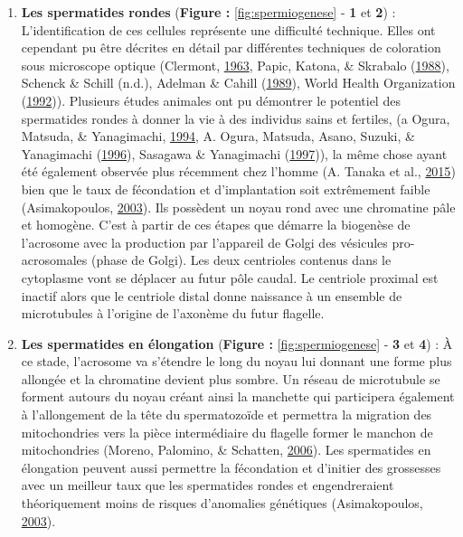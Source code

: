 \documentclass[12pt,twoside]{reedthesis}
\theoremstyle{definition}
\theoremstyle{definition}
\theoremstyle{remark}
\begin{document}
  \begin{enumerate}
  \def\labelenumi{\arabic{enumi}.}
  \item
    \textbf{Les spermatides rondes} (\textbf{Figure :
    }\ref{fig:spermiogenese} - \textbf{1} et \textbf{2}) :
    L'identification de ces cellules représente une difficulté technique.
    Elles ont cependant pu être décrites en détail par différentes
    techniques de coloration sous microscope optique (Clermont,
    \protect\hyperlink{ref-Clermont1963}{1963}, Papic, Katona, \& Skrabalo
    (\protect\hyperlink{ref-Papic}{1988}), Schenck \& Schill (n.d.),
    Adelman \& Cahill (\protect\hyperlink{ref-Adelman1989}{1989}), World
    Health Organization
    (\protect\hyperlink{ref-WorldHealthOrganization1992}{1992})).
    Plusieurs études animales ont pu démontrer le potentiel des
    spermatides rondes à donner la vie à des individus sains et fertiles,
    (a Ogura, Matsuda, \& Yanagimachi,
    \protect\hyperlink{ref-Ogura1994}{1994}, A. Ogura, Matsuda, Asano,
    Suzuki, \& Yanagimachi (\protect\hyperlink{ref-Kimura1995}{1996}),
    Sasagawa \& Yanagimachi (\protect\hyperlink{ref-Sasagawa}{1997})), la
    même chose ayant été également observée plus récemment chez l'homme
    (A. Tanaka et al., \protect\hyperlink{ref-Tanaka2015}{2015}) bien que
    le taux de fécondation et d'implantation soit extrêmement faible
    (Asimakopoulos, \protect\hyperlink{ref-Asimakopoulos2003}{2003}). Ils
    possèdent un noyau rond avec une chromatine pâle et homogène. C'est à
    partir de ces étapes que démarre la biogenèse de l'acrosome avec la
    production par l'appareil de Golgi des vésicules pro-acrosomales
    (phase de Golgi). Les deux centrioles contenus dans le cytoplasme vont
    se déplacer au futur pôle caudal. Le centriole proximal est inactif
    alors que le centriole distal donne naissance à un ensemble de
    microtubules à l'origine de l'axonème du futur flagelle.
  \item
    \textbf{Les spermatides en élongation} (\textbf{Figure :
    }\ref{fig:spermiogenese} - \textbf{3} et \textbf{4}) : À ce stade,
    l'acrosome va s'étendre le long du noyau lui donnant une forme plus
    allongée et la chromatine devient plus sombre. Un réseau de
    microtubule se forment autours du noyau créant ainsi la manchette qui
    participera également à l'allongement de la tête du spermatozoïde et
    permettra la migration des mitochondries vers la pièce intermédiaire
    du flagelle former le manchon de mitochondries (Moreno, Palomino, \&
    Schatten, \protect\hyperlink{ref-Moreno2006}{2006}). Les spermatides
    en élongation peuvent aussi permettre la fécondation et d'initier des
    grossesses avec un meilleur taux que les spermatides rondes et
    engendreraient théoriquement moins de risques d'anomalies génétiques
    (Asimakopoulos, \protect\hyperlink{ref-Asimakopoulos2003}{2003}).
  \end{enumerate}
  
\end{document}
